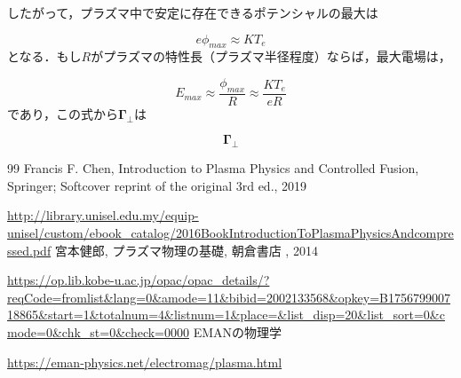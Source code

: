 \documentclass{ltjsarticle}
\numberwithin{equation}{section} %
\begin{document}
したがって，プラズマ中で安定に存在できるポテンシャルの最大は

\begin{equation}
  e\phi_{max} \approx KT_e \label{5.114}
\end{equation}
となる．もし$R$がプラズマの特性長（プラズマ半径程度）ならば，最大電場は，

\begin{equation}
  E_{max} \approx \frac{\phi_{max}}{R} \approx \frac{KT_e}{eR} \label{5.115}
\end{equation}
であり，この式から$\bm{\Gamma}_\perp$は

\begin{equation}
  \bm{\Gamma}_\perp 
\end{equation}










\begin{thebibliography}{99}
 Francis F. Chen, Introduction to Plasma Physics and Controlled Fusion, Springer; Softcover reprint of the original 3rd ed., 2019\par
\url{http://library.unisel.edu.my/equip-unisel/custom/ebook_catalog/2016BookIntroductionToPlasmaPhysicsAndcompressed.pdf}
 宮本健郎, プラズマ物理の基礎, 朝倉書店 , 2014\par
\url{https://op.lib.kobe-u.ac.jp/opac/opac_details/?reqCode=fromlist&lang=0&amode=11&bibid=2002133568&opkey=B175679900718865&start=1&totalnum=4&listnum=1&place=&list_disp=20&list_sort=0&cmode=0&chk_st=0&check=0000}
 EMANの物理学\par
\url{https://eman-physics.net/electromag/plasma.html}
\end{thebibliography}
\end{document}
